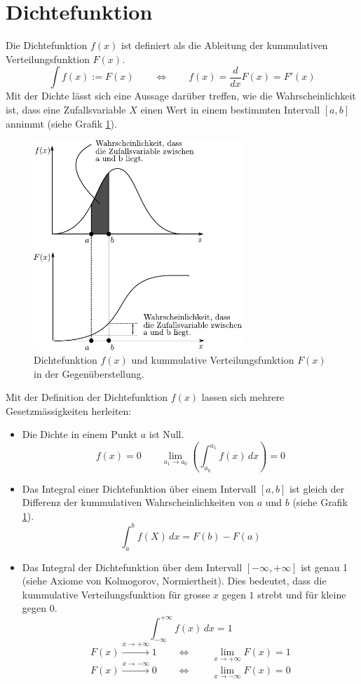 \newpage

\section{Dichtefunktion}
Die Dichtefunktion $f(x)$ ist definiert als die Ableitung der kummulativen
Verteilungsfunktion $F(x)$.
\[  
	\int f(x) := F(x) 
		\qquad 
		\Leftrightarrow 
		\qquad 
		f(x) = \frac{d}{dx} F(x)
		= F'(x)
\]
Mit der Dichte lässt sich eine Aussage darüber treffen, wie die 
Wahrscheinlichkeit ist, dass eine Zufallsvariable $X$ einen Wert
in einem bestimmten Intervall $[a,b]$ annimmt (siehe Grafik 
\ref{fig:dichte}).

\begin{figure}[h!]
	\centering
	\includegraphics[width=0.7\textwidth]{dichtefunktion.pdf}
	\caption{Dichtefunktion $f(x)$ und kummulative Verteilungsfunktion 
		$F(x)$ in der Gegenüberstellung.}
	\label{fig:dichte}
\end{figure}

Mit der Definition der Dichtefunktion $f(x)$ lassen sich mehrere 
Gesetzmässigkeiten herleiten:
\begin{itemize}
	\item Die Dichte in einem Punkt $a$ ist Null.
		\[ f(x) = 0 
			\qquad \lim_{a_1 \rightarrow a_0} \left(
				\int_{a_0}^{a_1} f(x)\,dx \right) = 0   \]
	\item Das Integral einer Dichtefunktion über einem Intervall
		$[a,b]$ ist gleich der Differenz der kummulativen
		Wahrscheinlichkeiten von $a$ und $b$ (siehe Grafik 
		\ref{fig:dichte}).
		\[ \int_a^b f(X)\, dx = F(b) - F(a) \]
	\item Das Integral der Dichtefunktion über dem Intervall 
		$[-\infty, +\infty]$ ist genau 1 
		(siehe \gls{Axiome von Kolmogorov}, \gls{Normiertheit}).
		Dies bedeutet, dass die kummulative Verteilungsfunktion
		für grosse $x$ gegen $1$ strebt und für kleine gegen $0$.
		\[ \int_{-\infty}^{+\infty} f(x)\, dx = 1 \]
		\[ F(x) \xrightarrow{x \rightarrow +\infty} 1
			\qquad \Leftrightarrow \qquad 
			\lim_{x \rightarrow + \infty} 
				F(x) = 1 \]
		\[ F(x) \xrightarrow{x \rightarrow -\infty} 0 
			\qquad \Leftrightarrow \qquad
			\lim_{x \rightarrow - \infty} 
				F(x) = 0 \]
\end{itemize}

